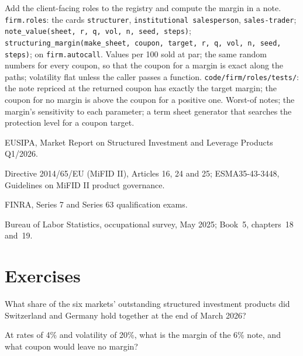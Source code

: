 \begin{build}
 Add the client-facing roles to the registry and compute the margin in a note.
 \texttt{firm.roles}: the cards \texttt{structurer}, \texttt{institutional salesperson},
\texttt{sales-trader}; \texttt{note\_value(sheet, r, q, vol, n, seed, steps)};
\texttt{structuring\_margin(make\_sheet, coupon, target, r, q, vol, n, seed, steps)}; on \texttt{firm.autocall}.
 Values per 100 sold at par; the same random numbers for every coupon, so that the coupon for a margin is
exact along the paths; volatility flat unless the caller passes a function.
 \texttt{code/firm/roles/tests/}: the note repriced at the returned coupon has exactly the target
margin; the coupon for no margin is above the coupon for a positive one.
 Worst-of notes; the margin's sensitivity to each parameter; a term sheet generator that searches the
protection level for a coupon target.
\end{build}

\begin{omsources}
\item EUSIPA, Market Report on Structured Investment and Leverage Products Q1/2026.
\item Directive 2014/65/EU (MiFID II), Articles 16, 24 and 25; ESMA35-43-3448, Guidelines on MiFID II product governance.
\item FINRA, Series 7 and Series 63 qualification exams.
\item Bureau of Labor Statistics, occupational survey, May 2025; Book~5, chapters~18 and~19.
\end{omsources}

\section{Exercises}

\begin{exercise}[$\star$]\label{exo:in:structurer-sales-and-sales-trader:1}
What share of the six markets' outstanding structured investment products did Switzerland and Germany hold together at
the end of March 2026?
\end{exercise}

\begin{exercise}[$\star$]\label{exo:in:structurer-sales-and-sales-trader:2}
At rates of 4\% and volatility of 20\%, what is the margin of the 6\% note, and what coupon would leave no margin?
\end{exercise}

